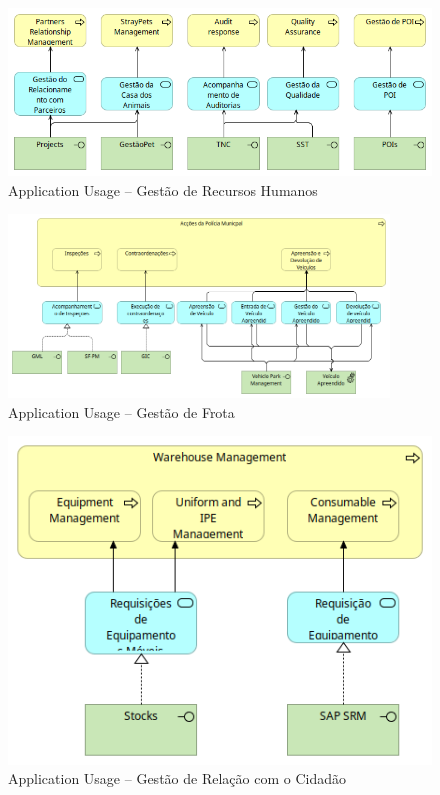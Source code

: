 \documentclass[12pt,a4paper,final]{article}
\begin{document}
    \begin{figure}[H]
        \centering
        \includegraphics[width=\textwidth]{Q10_5}
        \caption{Application Usage – Gestão de Recursos Humanos}
        \label{fig:q10_5}
    \end{figure}

    \begin{figure}[H]
        \centering
        \includegraphics[width=0.9\textwidth]{Q10_6}
        \caption{Application Usage – Gestão de Frota}
        \label{fig:q10_6}
    \end{figure}

    \begin{figure}[H]
        \centering
        \includegraphics[width=\textwidth]{Q10_7}
        \caption{Application Usage – Gestão de Relação com o Cidadão}
        \label{fig:q10_7}
    \end{figure}
\end{document}
